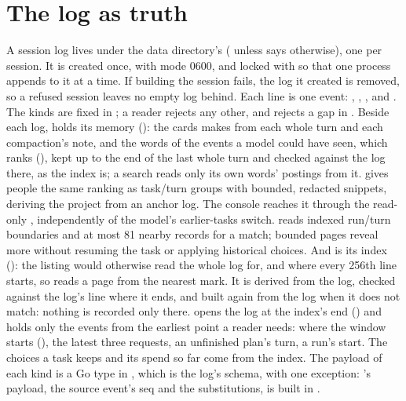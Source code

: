 \chapter{The log as truth}

A session log lives under the data directory's 
( unless
 says otherwise), one  per session.
It is created once, with mode 0600, and locked with  so that
one process appends to it at a time. If building the session fails, the
log it created is removed, so a refused session leaves no empty log behind.
Each line is one event:
, , ,  and . The
kinds are fixed in ; a reader rejects any other,
and rejects a gap in . Beside each log,  holds its memory (): the
cards  makes from each whole turn and each compaction's
note, and the words of the events a model could have seen, which
 ranks (), kept up to the end of the last whole
turn and checked against the log there, as the index is; a search reads only
its own words' postings from it.  gives
people the same ranking as task/turn groups with bounded, redacted snippets,
deriving the project from an anchor log. The console reaches it through the
read-only , independently of the model's earlier-tasks
switch.  reads indexed run/turn boundaries and at most 81
nearby records for a match; bounded pages reveal more without resuming the
task or applying historical choices. And  is its
index (): the listing  would otherwise read the
whole log for, and where every 256th line starts, so  reads
a page from the nearest mark. It is derived from the log, checked against
the log's line where it ends, and built again from the log when it does not
match: nothing is recorded only there.  opens the log at
the index's end () and holds only the events from the
earliest point a reader needs: where the window starts
(), the latest three requests, an unfinished
plan's turn, a run's start. The choices a task keeps and its spend so far
come from the index. The payload of each kind is a Go type in
, which is the log's schema, with one
exception: 's payload, the source event's seq and the
substitutions, is built in .

